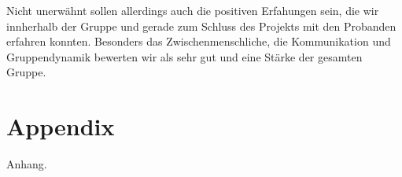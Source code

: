 \documentclass{Bericht}
\begin{document}
Nicht unerwähnt sollen allerdings auch die positiven Erfahungen sein, die wir innherhalb der Gruppe und gerade zum Schluss des Projekts mit den Probanden erfahren konnten. Besonders das Zwischenmenschliche, die Kommunikation und Gruppendynamik bewerten wir als sehr gut und eine Stärke der gesamten Gruppe. 


\section{Appendix} %
	Anhang.
	
\vfill %

\printbibliography
\end{document}
